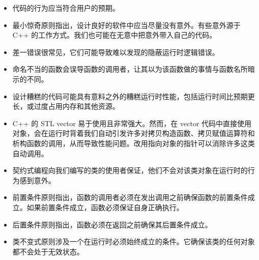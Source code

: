 \begin{itemize}
\item 代码的行为应当符合用户的预期。
\item 最小惊奇原则指出，设计良好的软件中应当尽量没有意外。有些意外源于 C++ 的工作方式。我们也可能在无意中把意外带入自己的代码。
\item 差一错误很常见，它们可能导致难以发现的隐蔽运行时逻辑错误。
\item 命名不当的函数会误导函数的调用者，让其以为该函数做的事情与函数名所暗示的不同。
\item 设计糟糕的代码可能具有意料之外的糟糕运行时性能，包括运行时间比预期更长，或过度占用内存和其他资源。
\item C++ 的 STL vector 易于使用且非常强大。然而，在 vector 代码中直接使用对象，会在运行时背着我们自动引发许多对拷贝构造函数、拷贝赋值运算符和析构函数的调用，从而导致性能问题。改用指向对象的指针可以消除许多这类自动调用。
\item 契约式编程向我们编写的类的使用者保证，他们不会对该类对象在运行时的行为感到意外。
\item 前置条件原则指出，函数的调用者必须在发出调用之前确保函数的前置条件成立。如果前置条件成立，函数必须保证自身正确执行。
\item 后置条件原则指出，函数必须在返回之前确保其后置条件成立。
\item 类不变式原则涉及一个在运行时必须始终成立的条件。它确保该类的任何对象都不会处于无效状态。
\end{itemize}
